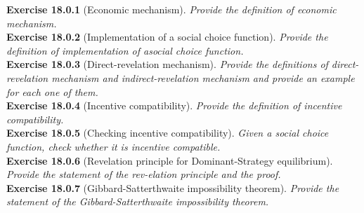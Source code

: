 \textbf{Exercise 18.0.1} (Economic mechanism). \textit{Provide the definition of economic mechanism.}\\

\textbf{Exercise 18.0.2} (Implementation of a social choice function). \textit{Provide the definition of implementation of asocial choice function.}\\

\textbf{Exercise 18.0.3} (Direct-revelation mechanism). \textit{Provide the definitions of direct-revelation mechanism and indirect-revelation mechanism and provide an example for each one of them.}\\

\textbf{Exercise 18.0.4} (Incentive compatibility). \textit{Provide the definition of incentive compatibility.}\\

\textbf{Exercise 18.0.5} (Checking incentive compatibility). \textit{Given a social choice function, check whether it is incentive compatible.}\\

\textbf{Exercise 18.0.6} (Revelation principle for Dominant-Strategy equilibrium). \textit{Provide the statement of the rev-elation principle and the proof.}\\

\textbf{Exercise 18.0.7} (Gibbard-Satterthwaite impossibility theorem). \textit{Provide the statement of the Gibbard-Satterthwaite impossibility theorem.}\\